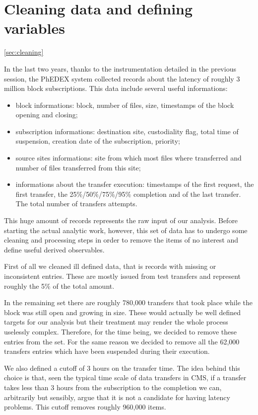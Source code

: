 \section{Cleaning data and defining variables}
\ref{sec:cleaning}

In the last two years, thanks to the instrumentation detailed in the
previous session, the PhEDEX system collected records about the
latency of roughly 3 million block subscriptions.  This data include
several useful informations:

\begin{itemize}
\item block informations: block, number of files, size, timestamps of
    the block opening and closing;
\item subscription informations: destination site, custodiality flag,
    total time of suspension, creation date of the subscription,
    priority;
\item source sites informations: site from which most files where
    transferred and number of files transferred from this site;

\item informations about the transfer execution: timestamps of the first
    request, the first transfer, the 25\%/50\%/75\%/95\% completion and of
    the last transfer. The total number of transfers attempts.
\end{itemize}

This huge amount of records represents the raw input of our
analysis. Before starting the actual analytic work, however, this set
of data has to undergo some cleaning and processing steps in order to
remove the items of no interest and define useful derived observables.

First of all we cleaned ill defined data, that is records with missing
or inconsistent entries. These are mostly issued from test transfers
and represent roughly the 5\% of the total amount.

In the remaining set there are roughly 780,000 transfers that took
place while the block was still open and growing in size. These would
actually be well defined targets for our analysis but their treatment
may render the whole process uselessly complex. Therefore, for the
time being, we decided to remove these entries from the set. For the
same reason we decided to remove all the 62,000 transfers entries
which have been suspended during their execution.

We also defined a cutoff of 3 hours on the transfer time. The idea
behind this choice is that, seen the typical time scale of data
transfers in CMS, if a transfer takes less than 3 hours from the
subscription to the completion we can, arbitrarily but sensibly, argue
that it is not a candidate for having latency problems. This cutoff
removes roughly 960,000 items.

